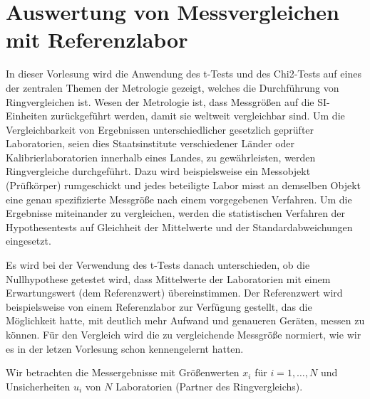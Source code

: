 
\section{Auswertung von Messvergleichen mit Referenzlabor}
In dieser Vorlesung wird die Anwendung des t-Tests und des Chi2-Tests auf eines der zentralen Themen der Metrologie gezeigt, 
welches die Durchführung von Ringvergleichen ist. Wesen der Metrologie ist, dass Messgrößen auf die SI-Einheiten zurückgeführt werden, 
damit sie weltweit vergleichbar sind. Um die Vergleichbarkeit von Ergebnissen unterschiedlicher gesetzlich geprüfter Laboratorien, seien dies Staatsinstitute verschiedener Länder oder Kalibrierlaboratorien innerhalb eines Landes, zu gewährleisten, werden Ringvergleiche durchgeführt.
Dazu wird beispielsweise ein Messobjekt (Prüfkörper) rumgeschickt und jedes beteiligte Labor misst an demselben Objekt eine genau spezifizierte Messgröße nach einem vorgegebenen Verfahren. Um die Ergebnisse miteinander zu vergleichen, werden die statistischen Verfahren der Hypothesentests auf Gleichheit der Mittelwerte und der Standardabweichungen eingesetzt.

Es wird bei der Verwendung des t-Tests danach unterschieden, ob die Nullhypothese getestet wird, dass Mittelwerte der Laboratorien mit einem Erwartungswert (dem Referenzwert) übereinstimmen.
Der Referenzwert wird beispielsweise von einem Referenzlabor zur Verfügung gestellt, das die Möglichkeit hatte, mit deutlich mehr Aufwand und genaueren Geräten, messen zu können.
Für den Vergleich wird die zu vergleichende Messgröße normiert, wie wir es in der letzen Vorlesung schon kennengelernt hatten.

Wir betrachten die Messergebnisse mit Größenwerten $x_i$ für $i = 1,\dots,N$ und Unsicherheiten $u_i$ von $N$ Laboratorien (Partner des Ringvergleichs).

